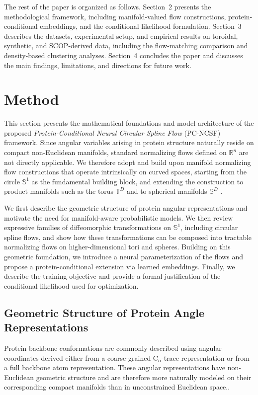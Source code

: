 \documentclass{article}
\begin{document}
{\color{red}
The rest of the paper is organized as follows. Section~2 presents the
methodological framework, including manifold-valued flow constructions,
protein-conditional embeddings, and the conditional likelihood formulation.
Section~3 describes the datasets, experimental setup, and empirical results
on toroidal, synthetic, and SCOP-derived data, including the flow-matching
comparison and density-based clustering analyses. Section~4 concludes the
paper and discusses the main findings, limitations, and directions for
future work.
}
\section{Method}

This section presents the mathematical foundations and model architecture of the proposed
\emph{Protein-Conditional Neural Circular Spline Flow} (PC-NCSF) framework.
Since angular variables arising in protein structure naturally reside on compact
non-Euclidean manifolds, standard normalizing flows defined on $\mathbb{R}^n$ are not directly applicable.
We therefore adopt and build upon manifold normalizing flow constructions that operate intrinsically on curved spaces, starting from the circle $\mathbb{S}^1$ as the fundamental building block, and extending the construction to product manifolds such as the torus $\mathbb{T}^D$ and to spherical manifolds $\mathbb{S}^D$ \cite{Rezende2020}.

We first describe the geometric structure of protein angular representations and
motivate the need for manifold-aware probabilistic models.
We then review expressive families of diffeomorphic transformations on $\mathbb{S}^1$,
including circular spline flows, and show how these transformations can be composed
into tractable normalizing flows on higher-dimensional tori and spheres.
Building on this geometric foundation, we introduce a neural parameterization of the flows
and propose a protein-conditional extension via learned embeddings.
Finally, we describe the training objective and provide a formal justification
of the conditional likelihood used for optimization.


\subsection{Geometric Structure of Protein Angle Representations}
Protein backbone conformations are commonly described using angular coordinates derived either from a coarse-grained C$_\alpha$-trace representation or from a full backbone atom representation. {\color{red} These angular representations have non-Euclidean geometric structure and are therefore more naturally modeled on their corresponding compact manifolds than in unconstrained Euclidean space.}\cite{oldfield1994}.
\end{document}

